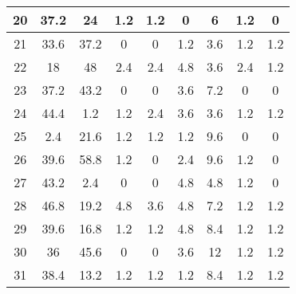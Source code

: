 \begin{table}[h!]
\begin{tabular}{|c|c|c|c|c|c|c|c|c|}
20           & 37.2  & 24   & 1.2  & 1.2   & 0     & 6     & 1.2   & 0     \\ \hline
21           & 33.6  & 37.2 & 0    & 0     & 1.2   & 3.6   & 1.2   & 1.2   \\ \hline
22           & 18    & 48   & 2.4  & 2.4   & 4.8   & 3.6   & 2.4   & 1.2   \\ \hline
23           & 37.2  & 43.2 & 0    & 0     & 3.6   & 7.2   & 0     & 0     \\ \hline
24           & 44.4  & 1.2  & 1.2  & 2.4   & 3.6   & 3.6   & 1.2   & 1.2   \\ \hline
25           & 2.4   & 21.6 & 1.2  & 1.2   & 1.2   & 9.6   & 0     & 0     \\ \hline
26           & 39.6  & 58.8 & 1.2  & 0     & 2.4   & 9.6   & 1.2   & 0     \\ \hline
27           & 43.2  & 2.4  & 0    & 0     & 4.8   & 4.8   & 1.2   & 0     \\ \hline
28           & 46.8  & 19.2 & 4.8  & 3.6   & 4.8   & 7.2   & 1.2   & 1.2   \\ \hline
29           & 39.6  & 16.8 & 1.2  & 1.2   & 4.8   & 8.4   & 1.2   & 1.2   \\ \hline
30           & 36    & 45.6 & 0    & 0     & 3.6   & 12    & 1.2   & 1.2   \\ \hline
31           & 38.4  & 13.2 & 1.2  & 1.2   & 1.2   & 8.4   & 1.2   & 1.2   \\ \hline

\end{tabular}
\end{table}

